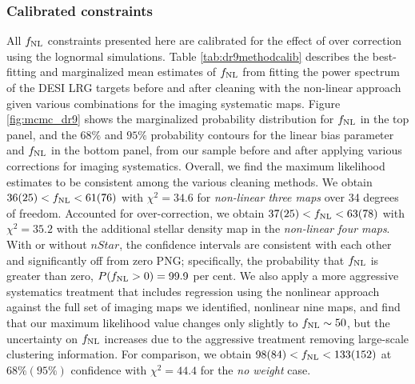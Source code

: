 \subsubsection{Calibrated constraints}
All $f_{\rm NL}$ constraints presented here are calibrated for the effect of over correction using the lognormal simulations. Table \ref{tab:dr9methodcalib} describes the best-fitting and marginalized mean estimates of $f_{\rm NL}$ from fitting the power spectrum of the DESI LRG targets before and after cleaning with the non-linear approach given various combinations for the imaging systematic maps. Figure \ref{fig:mcmc_dr9} shows the marginalized probability distribution for $f_{\rm NL}$ in the top panel, and the $68\%$ and $95\%$ probability contours for the linear bias parameter and $f_{\rm NL}$ in the bottom panel, from our sample before and after applying various corrections for imaging systematics. Overall, we find the maximum likelihood estimates to be consistent among the various cleaning methods. We obtain $36 (25) < f_{\rm NL} < 61(76)$ with $\chi^{2}=34.6$ for \textit{non-linear three maps} over 34 degrees of freedom. Accounted for over-correction, we obtain $37(25) < f_{\rm NL} < 63(78)$ with $\chi^{2}=35.2$ with the additional stellar density map in the \textit{non-linear four maps}. With or without $nStar$, the confidence intervals are consistent with each other and significantly off from zero PNG; specifically, the probability that $f_{\rm NL}$ is greater than zero, $P(f_{\rm NL} >0)=99.9$ per cent. We also apply a more aggressive systematics treatment that includes regression using the nonlinear approach against the full set of imaging maps we identified, nonlinear nine maps, and find that our maximum
likelihood value changes only slightly to $f_{\rm NL} \sim 50$, but the uncertainty on $f_{\rm NL}$ increases due
to the aggressive treatment removing large-scale clustering information. For comparison, we obtain $98(84) < f_{\rm NL} < 133(152)$ at $68\% (95\%)$ confidence with $\chi^{2}=44.4$ for the \textit{no weight} case.


